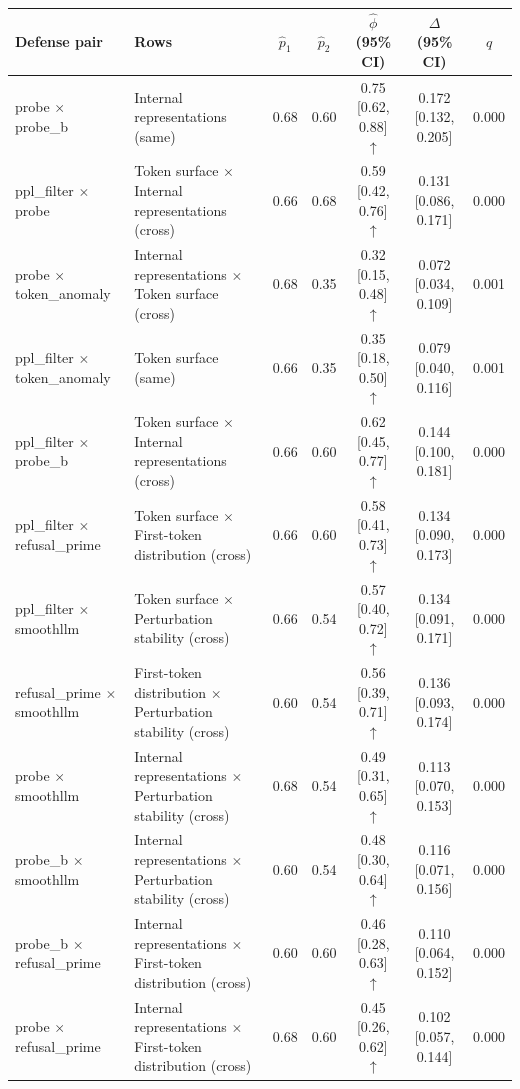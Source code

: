 \begin{tabular}{llccccc}
\toprule
Defense pair & Rows & $\hat p_1$ & $\hat p_2$ & $\hat\phi$ (95\% CI) & $\Delta$ (95\% CI) & $q$ \\
\midrule
probe $\times$ probe_b & Internal representations (same) & 0.68 & 0.60 & 0.75 [0.62, 0.88] $\uparrow$ & 0.172 [0.132, 0.205] & 0.000 \\
ppl_filter $\times$ probe & Token surface $\times$ Internal representations (cross) & 0.66 & 0.68 & 0.59 [0.42, 0.76] $\uparrow$ & 0.131 [0.086, 0.171] & 0.000 \\
probe $\times$ token_anomaly & Internal representations $\times$ Token surface (cross) & 0.68 & 0.35 & 0.32 [0.15, 0.48] $\uparrow$ & 0.072 [0.034, 0.109] & 0.001 \\
ppl_filter $\times$ token_anomaly & Token surface (same) & 0.66 & 0.35 & 0.35 [0.18, 0.50] $\uparrow$ & 0.079 [0.040, 0.116] & 0.001 \\
ppl_filter $\times$ probe_b & Token surface $\times$ Internal representations (cross) & 0.66 & 0.60 & 0.62 [0.45, 0.77] $\uparrow$ & 0.144 [0.100, 0.181] & 0.000 \\
ppl_filter $\times$ refusal_prime & Token surface $\times$ First-token distribution (cross) & 0.66 & 0.60 & 0.58 [0.41, 0.73] $\uparrow$ & 0.134 [0.090, 0.173] & 0.000 \\
ppl_filter $\times$ smoothllm & Token surface $\times$ Perturbation stability (cross) & 0.66 & 0.54 & 0.57 [0.40, 0.72] $\uparrow$ & 0.134 [0.091, 0.171] & 0.000 \\
refusal_prime $\times$ smoothllm & First-token distribution $\times$ Perturbation stability (cross) & 0.60 & 0.54 & 0.56 [0.39, 0.71] $\uparrow$ & 0.136 [0.093, 0.174] & 0.000 \\
probe $\times$ smoothllm & Internal representations $\times$ Perturbation stability (cross) & 0.68 & 0.54 & 0.49 [0.31, 0.65] $\uparrow$ & 0.113 [0.070, 0.153] & 0.000 \\
probe_b $\times$ smoothllm & Internal representations $\times$ Perturbation stability (cross) & 0.60 & 0.54 & 0.48 [0.30, 0.64] $\uparrow$ & 0.116 [0.071, 0.156] & 0.000 \\
probe_b $\times$ refusal_prime & Internal representations $\times$ First-token distribution (cross) & 0.60 & 0.60 & 0.46 [0.28, 0.63] $\uparrow$ & 0.110 [0.064, 0.152] & 0.000 \\
probe $\times$ refusal_prime & Internal representations $\times$ First-token distribution (cross) & 0.68 & 0.60 & 0.45 [0.26, 0.62] $\uparrow$ & 0.102 [0.057, 0.144] & 0.000 \\

\end{tabular}
